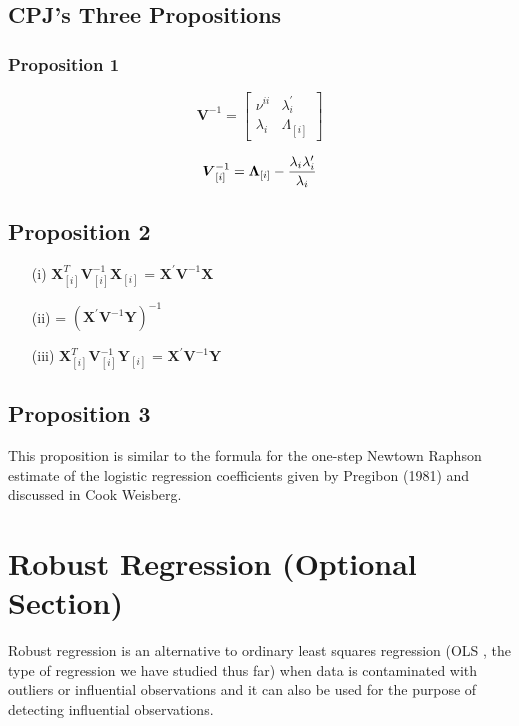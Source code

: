 \documentclass[12pt, a4paper]{article}
\theoremstyle{plain}
\theoremstyle{definition}
\theoremstyle{remark}
\begin{document}
\subsection{CPJ's Three Propositions} %


\subsubsection{Proposition 1}

\[
\boldsymbol{V}^{-1} =
\left[ \begin{array}{cc}
\nu^{ii} & \lambda_{i}^{\prime}  \\
\lambda_{i} & \Lambda_{[i]}
\end{array}\right] \]


\[\boldsymbol{V}_{[i]}^{-1} = \boldsymbol{\Lambda}_{[i]} - { \lambda_{i} \lambda_{i} ^{\prime} \over \lambda_{i} } \]

\subsection{Proposition 2}

\begin{itemize}
\item[(i)] $ \boldsymbol{X}_{[i]}^{T}\boldsymbol{V}^{-1}_{[i]}\boldsymbol{X}_{[i]}$ = $\boldsymbol{X}^{\prime}\boldsymbol{V}^{-1}\boldsymbol{X}$
\item[(ii)] = $(\boldsymbol{X}^{\prime}\boldsymbol{V}^{-1}\boldsymbol{Y})^{-1}$
\item[(iii)] $ \boldsymbol{X}_{[i]}^{T}\boldsymbol{V}^{-1}_{[i]}\boldsymbol{Y}_{[i]}$ = $\boldsymbol{X}^{\prime}\boldsymbol{V}^{-1}\boldsymbol{Y}$
\end{itemize}
\subsection{Proposition 3}
This proposition is similar to the formula for the one-step Newtown Raphson estimate of the logistic regression coefficients given by Pregibon (1981) and discussed in Cook Weisberg.
\newpage
\newpage
\section{Robust Regression (Optional Section)}

Robust regression is an alternative to ordinary least squares regression (OLS , the type of regression we have studied thus far) when data is contaminated with outliers or influential observations and it can also be used for the purpose of detecting influential observations.
\end{document}
